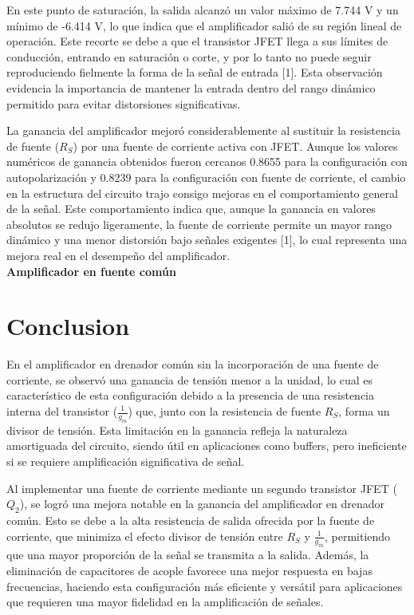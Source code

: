 \documentclass[journal]{IEEEtran}
\begin{document}
\par En este punto de saturación, la salida alcanzó un valor máximo de 7.744 V y un mínimo de -6.414 V, lo que indica que el amplificador salió de su región lineal de operación. Este recorte se debe a que el transistor JFET llega a sus límites de conducción, entrando en saturación o corte, y por lo tanto no puede seguir reproduciendo fielmente la forma de la señal de entrada [1]. Esta observación evidencia la importancia de mantener la entrada dentro del rango dinámico permitido para evitar distorsiones significativas.
\par La ganancia del amplificador mejoró considerablemente al sustituir la resistencia de fuente (\( R_S \)) por una fuente de corriente activa con JFET. Aunque los valores numéricos de ganancia obtenidos fueron cercanos 0.8655 para la configuración con autopolarización y 0.8239 para la configuración con fuente de corriente, el cambio en la estructura del circuito trajo consigo mejoras en el comportamiento general de la señal. Este comportamiento indica que, aunque la ganancia en valores absolutos se redujo ligeramente, la fuente de corriente permite un mayor rango dinámico y una menor distorsión bajo señales exigentes [1], lo cual representa una mejora real en el desempeño del amplificador.
\newline
\\
\textbf{Amplificador en fuente común}

\section{Conclusion}
\par En el amplificador en drenador común sin la incorporación de una fuente de corriente, se observó una ganancia de tensión menor a la unidad, lo cual es característico de esta configuración debido a la presencia de una resistencia interna del transistor ($\frac{1}{g_m}$) que, junto con la resistencia de fuente $R_S$, forma un divisor de tensión. Esta limitación en la ganancia refleja la naturaleza amortiguada del circuito, siendo útil en aplicaciones como buffers, pero ineficiente si se requiere amplificación significativa de señal.
\par Al implementar una fuente de corriente mediante un segundo transistor JFET ($Q_2$), se logró una mejora notable en la ganancia del amplificador en drenador común. Esto se debe a la alta resistencia de salida ofrecida por la fuente de corriente, que minimiza el efecto divisor de tensión entre $R_S$ y $\frac{1}{g_m}$, permitiendo que una mayor proporción de la señal se transmita a la salida. Además, la eliminación de capacitores de acople favorece una mejor respuesta en bajas frecuencias, haciendo esta configuración más eficiente y versátil para aplicaciones que requieren una mayor fidelidad en la amplificación de señales.
\end{document}
